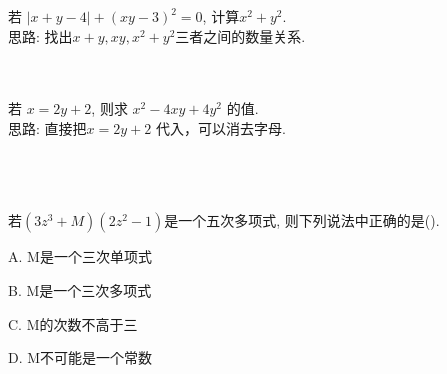 \begin{comment}
\item {
    已知 $a^2 + a - 3 = 0$, 计算$(a^2 - 3)(a+1)$. 
    \ifshowSolution
        \fangsong\zihao{4}
        \\
    \else
        \\ \\ \\
    \fi
}
\end{comment}

\item {
    若 $\lvert x+y-4 \rvert + (xy-3)^2 = 0$, 计算$x^2 + y^2$. 
    \ifshowSolution
        \fangsong{}
        \\
        思路: 找出$x+y, xy, x^2+y^2$三者之间的数量关系. 
    \else
        \\ \\ \\
    \fi
}

\begin{comment}
\item {
    在计算 $(ax+1)(2x+b)$时，小泉同学看错了$b$的值, 计算结果为$2x^2 + 6x + 4$; 小张同学看错了$a$ 的值，计算结果为 $4x^2+12x+5$. 

    (1) 求 $a, b$. \\
    (2) 计算 $(ax+1)(2x+b)$ 的正确结果. 
    \ifshowSolution
        \fangsong\zihao{4}
        \\
        思路: 小泉同学算出的a是正确的, 小张同学算出的b是正确的. 
    \else
        \\ \\ \\ \\ 
    \fi
}
\end{comment}

\item {
    若 $x=2y+2$, 则求 $x^2 - 4xy + 4y^2$ 的值. 
    \ifshowSolution
        \fangsong{}
        \\
        思路: 直接把$x=2y+2$ 代入，可以消去字母. 
    \else
        \\ \\ \\ \\ 
    \fi
}

\item {
    若$(3z^3 + M)(2z^2 - 1)$是一个五次多项式, 则下列说法中正确的是(\quad). 

    A. M是一个三次单项式

    B. M是一个三次多项式

    C. M的次数不高于三

    D. M不可能是一个常数
    \ifshowSolution
        \fangsong{}
        \\
    \else
        \\ \\ \\ \\ 
    \fi
}

